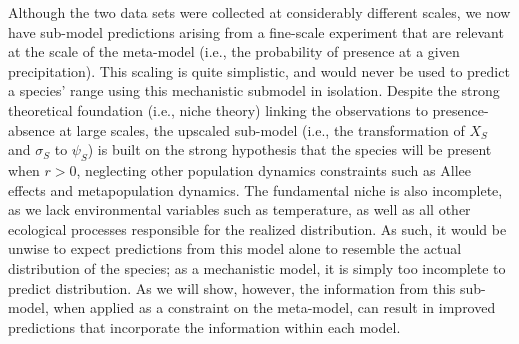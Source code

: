 Although the two data sets were collected at considerably different scales, we now have sub-model predictions arising from a fine-scale experiment that are relevant at the scale of the meta-model (i.e., the probability of presence at a given precipitation). 
This scaling is quite simplistic, and would never be used to predict a species' range using this mechanistic submodel in isolation.
Despite the strong theoretical foundation (i.e., niche theory) linking the observations to presence-absence at large scales, the upscaled sub-model (i.e., the transformation of \(X_S\) and \(\sigma_S\) to \(\psi_S\)) is built on the strong hypothesis that the species will be present when $r>0$, neglecting other population dynamics constraints such as Allee effects and metapopulation dynamics. 
The fundamental niche is also incomplete, as we lack environmental variables such as temperature, as well as all other ecological processes responsible for the realized distribution.
As such, it would be unwise to expect predictions from this model alone to resemble the actual distribution of the species; as a mechanistic model, it is simply too incomplete to predict distribution.
As we will show, however, the information from this sub-model, when applied as a constraint on the meta-model, can result in improved predictions that incorporate the information within each model.

